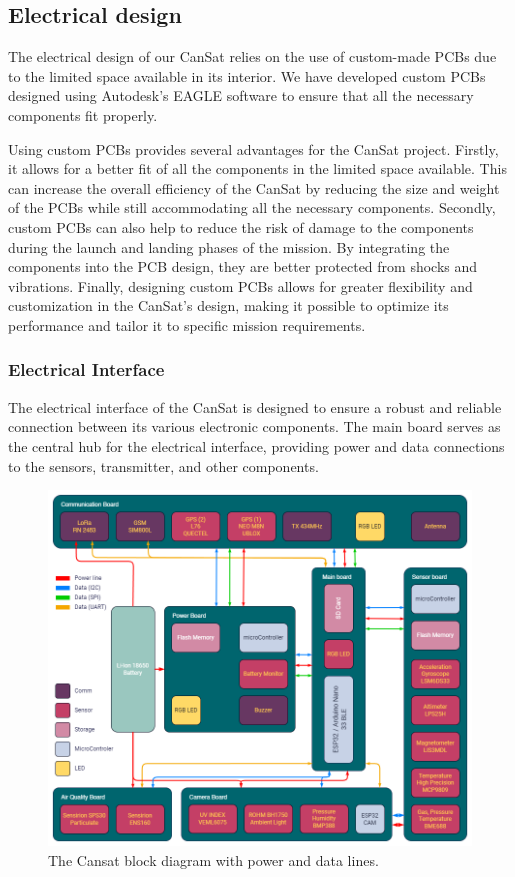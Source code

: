\documentclass[11pt]{article}
\begin{document}
\subsection{Electrical design}

The electrical design of our CanSat relies on the use of custom-made PCBs due to the limited space available in its interior. We have developed custom PCBs designed using Autodesk's EAGLE software to ensure that all the necessary components fit properly. 

Using custom PCBs provides several advantages for the CanSat project. Firstly, it allows for a better fit of all the components in the limited space available. This can increase the overall efficiency of the CanSat by reducing the size and weight of the PCBs while still accommodating all the necessary components. Secondly, custom PCBs can also help to reduce the risk of damage to the components during the launch and landing phases of the mission. By integrating the components into the PCB design, they are better protected from shocks and vibrations. Finally, designing custom PCBs allows for greater flexibility and customization in the CanSat's design, making it possible to optimize its performance and tailor it to specific mission requirements.

\subsubsection{Electrical Interface}
The electrical interface of the CanSat is designed to ensure a robust and reliable connection between its various electronic components. The main board serves as the central hub for the electrical interface, providing power and data connections to the sensors, transmitter, and other components.
\begin{figure}[htbp]
\centering
\includegraphics[width=\linewidth]{images/img_module_diagram.png}
\caption{\small{The Cansat block diagram with power and data lines.}}
\label{figmodule_diagrame}
\end{figure}
\end{document}

